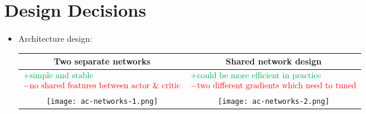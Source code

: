 \section{Design Decisions}
\begin{itemize}
	\item Architecture design:
	\begin{table}[hbt!]
		\centering
		\begin{tabular}{c|c}
			Two separate networks & Shared network design\\
			\hline\hline
			$\begin{matrix*}[l]
				\color{Green} + \text{simple and stable}\\
				\color{red} - \text{no shared features between actor \& critic}
			\end{matrix*}$ & $\begin{matrix*}[l]
				\color{Green} + \text{could be more efficient in practice}\\
				\color{red} - \text{two different gradients which need to tuned}
			\end{matrix*}$ \\ 
			\texttt{[image: ac-networks-1.png]} &
			\texttt{[image: ac-networks-2.png]}
		\end{tabular}
	\end{table}	
	

\end{itemize}
